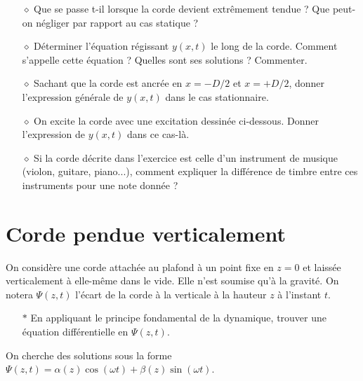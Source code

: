 \documentclass{report}
\begin{document}
\begin{itemize}

	\item[$\diamond$] Que se passe t-il lorsque la corde devient extrêmement tendue ? Que peut-on négliger par rapport au cas statique ?

	\item[$\diamond$] Déterminer l'équation régissant $y(x,t)$ le long de la corde. Comment s'appelle cette équation ? Quelles sont ses solutions ? Commenter.
	
	\item[$\diamond$] Sachant que la corde est ancrée en $x=-D/2$ et $x=+D/2$, donner l'expression générale de $y(x,t)$ dans le cas stationnaire. 
	
	\item[$\diamond$] On excite la corde avec une excitation dessinée ci-dessous. Donner l'expression de $y(x,t)$ dans ce cas-là.
	
	\item[$\diamond$] Si la corde décrite dans l'exercice est celle d'un instrument de musique (violon, guitare, piano...), comment expliquer la différence de timbre entre ces instruments pour une note donnée ?
	
\end{itemize}

\newpage

\section*{Corde pendue verticalement}

On considère une corde attachée au plafond à un point fixe en $z=0$ et laissée verticalement à elle-même dans le vide. Elle n'est soumise qu'à la gravité. On notera $\Psi(z,t)$ l'écart de la corde à la verticale à la hauteur $z$ à l'instant $t$.

\begin{itemize}

	\item[$\ast$] En appliquant le principe fondamental de la dynamique, trouver une équation différentielle en  $\Psi(z,t)$.

\end{itemize}

On cherche des solutions sous la forme $\Psi(z,t)=\alpha(z)\cos(\omega t)+\beta(z)\sin(\omega t)$. 
\end{document}

